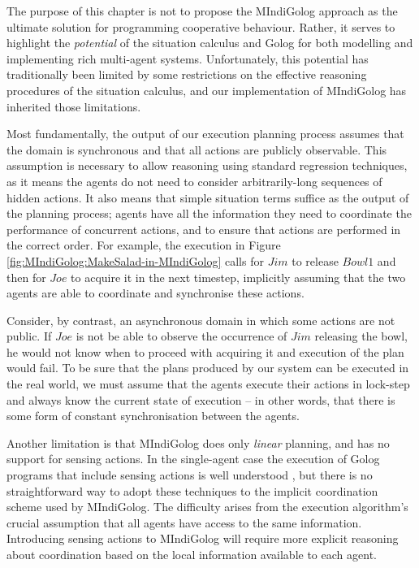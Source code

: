The purpose of this chapter is not to propose the MIndiGolog approach
as the ultimate solution for programming cooperative behaviour. Rather,
it serves to highlight the \emph{potential} of the situation calculus
and Golog for both modelling and implementing rich multi-agent systems.
Unfortunately, this potential has traditionally been limited by some
restrictions on the effective reasoning procedures of the situation
calculus, and our implementation of MIndiGolog has inherited those
limitations.

Most fundamentally, the output of our execution planning process assumes
that the domain is synchronous and that all actions are publicly observable.
This assumption is necessary to allow reasoning using standard regression
techniques, as it means the agents do not need to consider arbitrarily-long
sequences of hidden actions. It also means that simple situation terms
suffice as the output of the planning process; agents have all the
information they need to coordinate the performance of concurrent
actions, and to ensure that actions are performed in the correct order.
For example, the execution in Figure \ref{fig:MIndiGolog:MakeSalad-in-MIndiGolog}
calls for $Jim$ to release $Bowl1$ and then for $Joe$ to acquire
it in the next timestep, implicitly assuming that the two agents are
able to coordinate and synchronise these actions.

Consider, by contrast, an asynchronous domain in which some actions
are not public. If $Joe$ is not be able to observe the occurrence
of $Jim$ releasing the bowl, he would not know when to proceed with
acquiring it and execution of the plan would fail. To be sure that
the plans produced by our system can be executed in the real world,
we must assume that the agents execute their actions in lock-step
and always know the current state of execution -- in other words,
that there is some form of constant synchronisation between the agents.

Another limitation is that MIndiGolog does only \emph{linear} planning,
and has no support for sensing actions. In the single-agent case the
execution of Golog programs that include sensing actions is well understood
\citep{giacomo99indigolog,lakemeyer99golog_cats}, but there is no
straightforward way to adopt these techniques to the implicit coordination
scheme used by MIndiGolog. The difficulty arises from the execution
algorithm's crucial assumption that all agents have access to the
same information. Introducing sensing actions to MIndiGolog will require
more explicit reasoning about coordination based on the local information
available to each agent.

